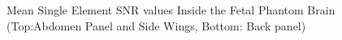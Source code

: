 \begin{figure}
\caption{Mean Single Element SNR values Inside the Fetal Phantom Brain (Top:Abdomen Panel and Side Wings, Bottom: Back
panel)}
\label{fig:loop_snr_contributions}
\end{figure}
